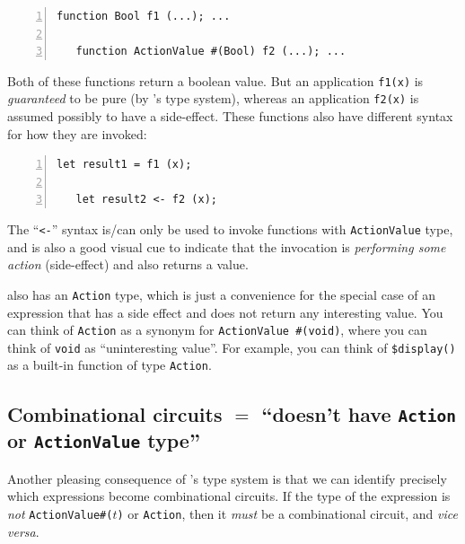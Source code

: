 
{\footnotesize
\begin{Verbatim}[frame=single, numbers=left]
   function Bool f1 (...); ...

   function ActionValue #(Bool) f2 (...); ...
\end{Verbatim}
}

Both of these functions return a boolean value.  But an application
{\tt f1(x)} is \emph{guaranteed} to be pure (by {\BSV}'s type system),
whereas an application {\tt f2(x)} is assumed possibly to have a
side-effect.  These functions also have different syntax for how they
are invoked:

{\footnotesize
\begin{Verbatim}[frame=single, numbers=left]
   let result1 = f1 (x);

   let result2 <- f2 (x);
\end{Verbatim}
}

The ``\verb|<-|'' syntax is/can only be used to invoke functions with
\verb|ActionValue| type, and is also a good visual cue to indicate
that the invocation is \emph{performing some action} (side-effect) and
also returns a value.

{\BSV} also has an \verb|Action| type, which is just a convenience for
the special case of an expression that has a side effect and does not
return any interesting value.  You can think of \verb|Action| as a
synonym for \verb|ActionValue #(void)|, where you can think of
\verb|void| as ``uninteresting value''.  For example, you can think of
\verb|$display()| as a built-in function of type \verb|Action|.


\subsection{Combinational circuits $=$ ``doesn't have {\tt Action} or {\tt ActionValue} type''}


Another pleasing consequence of {\BSV}'s type system is that we can
identify precisely which expressions become combinational circuits.
If the type of the expression is \emph{not} {\tt ActionValue\#($t$)}
or {\tt Action}, then it \emph{must} be a combinational circuit, and
\emph{vice versa}.


